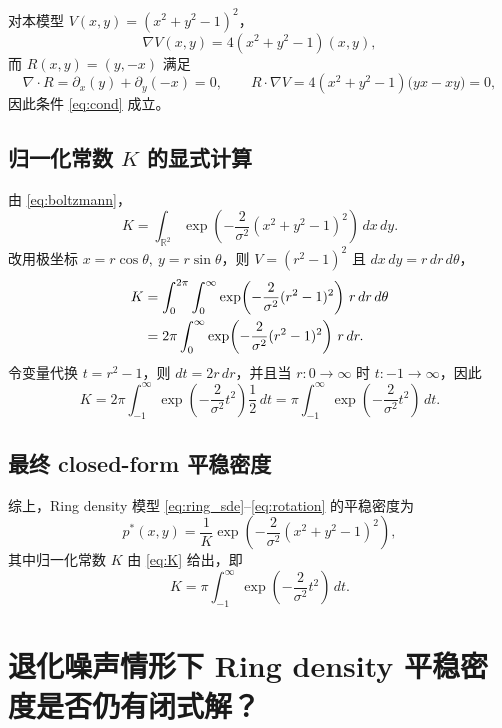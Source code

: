 	对本模型 $V(x,y)=(x^2+y^2-1)^2$，
	\[
	\nabla V(x,y)=4(x^2+y^2-1)(x,y),
	\]
	而 $R(x,y)=(y,-x)$ 满足
	\[
	\nabla\cdot R=\partial_x(y)+\partial_y(-x)=0,\qquad
	R\cdot\nabla V=4(x^2+y^2-1)\big(yx-xy\big)=0,
	\]
	因此条件 \eqref{eq:cond} 成立。
	
	\subsection{归一化常数 $K$ 的显式计算}
	
	由 \eqref{eq:boltzmann}，
	\[
	K=\int_{\mathbb{R}^2}\exp\!\left(-\frac{2}{\sigma^2}(x^2+y^2-1)^2\right)\,dx\,dy.
	\]
	改用极坐标 $x=r\cos\theta,\ y=r\sin\theta$，则 $V=(r^2-1)^2$ 且 $dx\,dy=r\,dr\,d\theta$，
	\begin{align}
		K
		&=\int_{0}^{2\pi}\int_{0}^{\infty}
		\exp\!\left(-\frac{2}{\sigma^2}(r^2-1)^2\right)\,r\,dr\,d\theta \notag\\
		&=2\pi\int_{0}^{\infty}
		\exp\!\left(-\frac{2}{\sigma^2}(r^2-1)^2\right)\,r\,dr.
	\end{align}
	令变量代换 $t=r^2-1$，则 $dt=2r\,dr$，并且当 $r:0\to\infty$ 时 $t:-1\to\infty$，因此
	\begin{equation}\label{eq:K}
		K
		=2\pi\int_{-1}^{\infty}\exp\!\left(-\frac{2}{\sigma^2}t^2\right)\frac{1}{2}\,dt
		=\pi\int_{-1}^{\infty}\exp\!\left(-\frac{2}{\sigma^2}t^2\right)\,dt.
	\end{equation}
	
	\subsection{最终 closed-form 平稳密度}
	
	综上，Ring density 模型 \eqref{eq:ring_sde}--\eqref{eq:rotation} 的平稳密度为
	\begin{equation}\label{eq:final}
		p^*(x,y)=\frac{1}{K}\exp\!\left(-\frac{2}{\sigma^2}(x^2+y^2-1)^2\right),
	\end{equation}
	其中归一化常数 $K$ 由 \eqref{eq:K} 给出，即
	\[
	K=\pi\int_{-1}^{\infty}\exp\!\left(-\frac{2}{\sigma^2}t^2\right)\,dt.
	\]
	
	
	\section{退化噪声情形下 Ring density 平稳密度是否仍有闭式解？}
	
